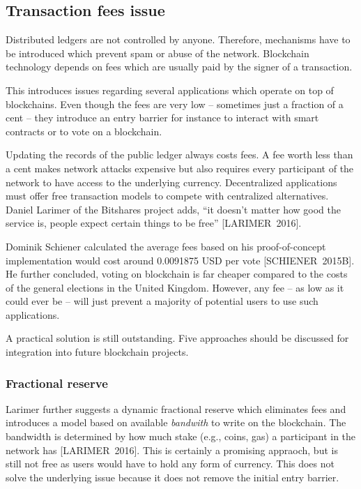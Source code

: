 \subsection{Transaction fees issue}
Distributed ledgers are not controlled by anyone. Therefore, mechanisms have to be introduced which prevent spam or abuse of the network. Blockchain technology depends on fees which are usually paid by the signer of a transaction.\par
This introduces issues regarding several applications which operate on top of blockchains. Even though the fees are very low -- sometimes just a fraction of a cent -- they introduce an entry barrier for instance to interact with smart contracts or to vote on a blockchain.\par
Updating the records of the public ledger always costs fees. A fee worth less than a cent makes network attacks expensive but also requires every participant of the network to have access to the underlying currency. Decentralized applications must offer free transaction models to compete with centralized alternatives. Daniel Larimer of the Bitshares project adds, \enquote{it doesn't matter how good the service is, people expect certain things to be free} [LARIMER~2016].\par
Dominik Schiener calculated the average fees based on his proof-of-concept implementation would cost around 0.0091875 USD per vote [SCHIENER~2015B]. He further concluded, voting on blockchain is far cheaper compared to the costs of the general elections in the United Kingdom. However, any fee -- as low as it could ever be -- will just prevent a majority of potential users to use such applications.\par
A practical solution is still outstanding. Five approaches should be discussed for integration into future blockchain projects.
\subsubsection{Fractional reserve}
Larimer further suggests a dynamic fractional reserve which eliminates fees and introduces a model based on available \textit{bandwith} to write on the blockchain. The bandwidth is determined by how much stake (e.g., coins, gas) a participant in the network has [LARIMER~2016]. This is certainly a promising appraoch, but is still not free as users would have to hold any form of currency. This does not solve the underlying issue because it does not remove the initial entry barrier.
